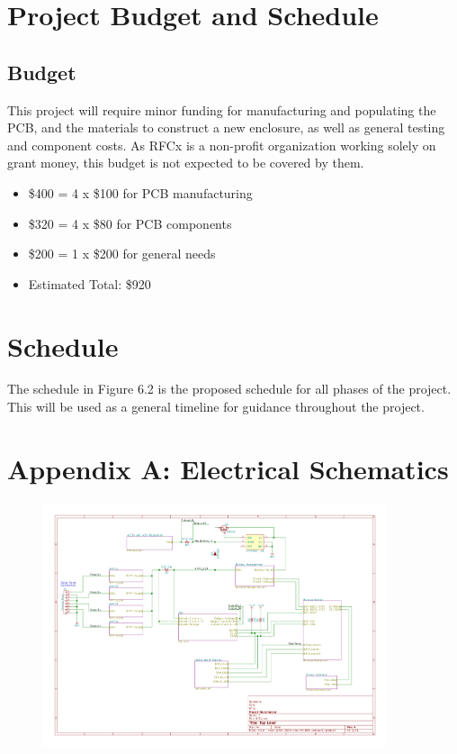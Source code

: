 \documentclass{article}
\begin{document}
{\section{Project Budget and Schedule}
\subsection{Budget}
This project will require minor funding for manufacturing and populating the PCB, and the materials to construct a new enclosure, as well as general testing and component costs. As RFCx is a non-profit organization working solely on grant money, this budget is not expected to be covered by them.
\begin{itemize}
\item \$400 = 4 x \$100 for PCB manufacturing
\item \$320 = 4 x \$80 for PCB components
\item \$200 = 1 x \$200 for general needs
\item Estimated Total: \$920
\end{itemize}

\section{Schedule}
The schedule in Figure 6.2 is the proposed schedule for all phases of the project. This will be used as a general timeline for guidance throughout the project.




\newpage
\section*{Appendix A: Electrical Schematics}

\begin{figure}[H]
	\centering
	\includegraphics[page=1,width=0.9\textwidth]{RFCxSchematics.pdf}
	\caption{}
	\label{fig:schemp1}
\end{figure}

}
\end{document}
